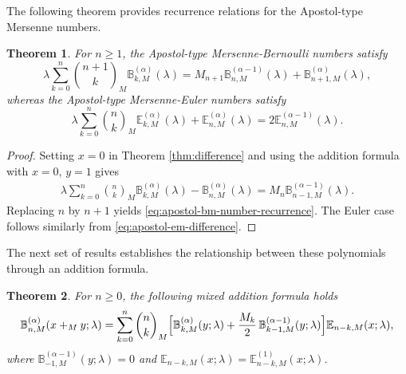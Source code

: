 \documentclass[10pt,a4paper]{amsart}
\newtheorem{theorem}{Theorem}[section]
\numberwithin{equation}{section}
\newcommand{\B}{\mathbb{B}}
\newcommand{\E}{\mathbb{E}}
\begin{document}
The following theorem provides recurrence relations for the Apostol-type Mersenne numbers.

\begin{theorem}\label{thm:number-recurrence}
For $n\ge 1$, the Apostol-type Mersenne-Bernoulli numbers satisfy
\begin{equation}\label{eq:apostol-bm-number-recurrence}
\lambda \sum_{k=0}^n \binom{n+1}{k}_M \B_{k,M}^{(\alpha)}(\lambda) = M_{n+1} \B_{n,M}^{(\alpha-1)}(\lambda) + \B_{n+1,M}^{(\alpha)}(\lambda),
\end{equation}
whereas the Apostol-type Mersenne-Euler numbers satisfy
\begin{equation}\label{eq:apostol-em-number-recurrence}
\lambda \sum_{k=0}^n \binom{n}{k}_M \E_{k,M}^{(\alpha)}(\lambda) + \E_{n,M}^{(\alpha)}(\lambda) = 2 \E_{n,M}^{(\alpha-1)}(\lambda).
\end{equation}
\end{theorem}

\begin{proof}
Setting $x=0$ in Theorem \ref{thm:difference} and using the addition formula with $x=0$, $y=1$ gives
\begin{align*}
\lambda \sum_{k=0}^n \binom{n}{k}_M \B_{k,M}^{(\alpha)}(\lambda) - \B_{n,M}^{(\alpha)}(\lambda) = M_n \B_{n-1,M}^{(\alpha-1)}(\lambda).
\end{align*}
Replacing $n$ by $n+1$ yields \eqref{eq:apostol-bm-number-recurrence}. The Euler case follows similarly from \eqref{eq:apostol-em-difference}.
\end{proof}

The next set of results establishes the relationship between these polynomials through an addition formula.
\begin{theorem}\label{thm:mixed-bernoulli}
For $n\geq 0$, the following mixed addition formula holds
\[
\B_{n,M}^{(\alpha)}(x+_M y;\lambda)
= \sum_{k=0}^n \binom{n}{k}_M
\Bigl[\B_{k,M}^{(\alpha)}(y;\lambda) + \frac{M_k}{2}\,\B_{k-1,M}^{(\alpha-1)}(y;\lambda)\Bigr]
\E_{n-k,M}(x;\lambda),
\]
where $\B_{-1,M}^{(\alpha-1)}(y;\lambda)=0$ and $\E_{n-k,M}(x;\lambda)=\E_{n-k,M}^{(1)}(x;\lambda)$.
\end{theorem}
\end{document}
